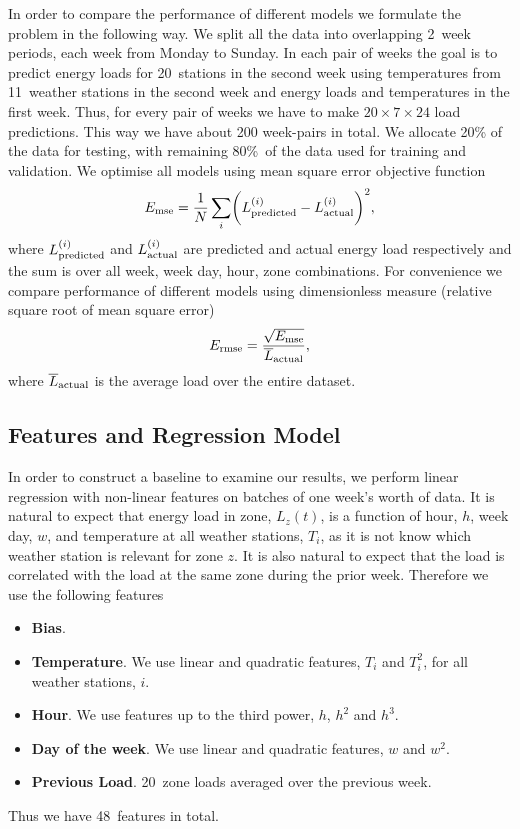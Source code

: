 \documentclass{article} %
\newcommand{\Ermse}{E_{\rm \scriptsize rmse}}
\begin{document}
In order to compare the performance of different models we formulate the 
problem in the following way. We split all the data into overlapping
2~week periods, each week from Monday to Sunday.
In each pair of weeks the goal is to predict energy loads for 20~stations
in the second week
using temperatures from 11~weather stations in the second week and 
energy loads and temperatures in the first week. 
Thus, for every pair of weeks 
we have to make $20\times7\times24$ load predictions.
This way we have about 200 week-pairs in total.
We allocate 20\% of the data for testing, with remaining 80\%~of the 
data used for training and validation.
We optimise all models using mean square error objective function
\begin{equation}
	E_{\rm\scriptsize mse} = 
	\frac{1}{N}\sum_i \biggl(
	L_{\rm\scriptsize predicted}^{(i)}-
	L_{\rm\scriptsize actual}^{(i)}\biggr)^2,
\end{equation}
where $L_{\rm\scriptsize predicted}^{(i)}$
and $L_{\rm\scriptsize actual}^{(i)}$ are predicted and actual
energy load respectively and the sum is over all week, week day, hour, zone
combinations.
For convenience we compare performance of different models using dimensionless
measure (relative square root of mean square error)
\begin{equation}
	\Ermse =
	\frac{\sqrt{E_{\rm\scriptsize mse} }}{\overline{L}_{\rm\scriptsize actual}}, 
\end{equation}
where $\overline{L}_{\rm\scriptsize actual}$ is the average load
over the entire dataset.


\subsection{Features and Regression Model}
\label{sec:energy/reg}

In order to construct a baseline to examine our results, we perform 
linear regression with non-linear features on batches of one week's worth of data.
It is natural to expect that energy load in zone, $L_z(t)$, 
is a function of 
hour, $h$, week day, $w$, and temperature at all weather stations, $T_i$,
as it is not know which weather station is relevant for zone $z$.
It is also natural to expect that the load is correlated with the load 
at the same zone during the prior week.
Therefore we use the following features
\begin{itemize}
	\item {\bf Bias}.
	\item {\bf Temperature}. We use linear and quadratic features, $T_i$ 
	and $T_i^2$, for all weather stations, $i$.
	\item {\bf Hour}. We use features up to the third power, $h$, $h^2$
	and $h^3$.
	\item {\bf Day of the week}. We use linear and quadratic features,
	$w$ and $w^2$.
	\item {\bf Previous Load}. 20~zone loads averaged over the previous week.
\end{itemize}
Thus we have 48~features in total.
\end{document}
